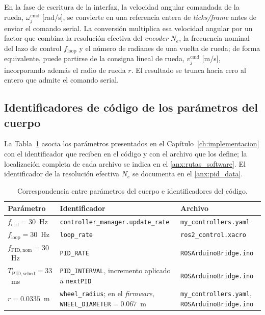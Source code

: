 \begin{appendices}
En la fase de escritura de la interfaz, la velocidad angular comandada de la rueda, $\omega_j^{\mathrm{cmd}}$ [rad/s], se convierte en una referencia entera de \textit{ticks/frame} antes de enviar el comando serial. La conversión multiplica esa velocidad angular por un factor que combina la resolución efectiva del \textit{encoder} $N_e$, la frecuencia nominal del lazo de control $f_{\mathrm{loop}}$ y el número de radianes de una vuelta de rueda; de forma equivalente, puede partirse de la consigna lineal de rueda, $v_j^{\mathrm{cmd}}$ [m/s], incorporando además el radio de rueda $r$. El resultado se trunca hacia cero al entero que admite el comando serial.

\subsection{Identificadores de código de los parámetros del cuerpo}
\label{anx:identificadores}

La Tabla~\ref{tab:anx_identificadores} asocia los parámetros presentados en el
Capítulo~\ref{ch:implementacion} con el identificador que reciben en el
código y con el archivo que los define; la localización completa de cada
archivo se indica en el \ref{anx:rutas_software}. El identificador de la
resolución efectiva $N_e$ se documenta en el \ref{anx:pid_data}.

\begin{table}[H]
\centering
\caption{Correspondencia entre parámetros del cuerpo e identificadores del código.}
\label{tab:anx_identificadores}
\small
\begin{tabular}{p{3.5cm} p{6.3cm} p{4.1cm}}
\toprule
\textbf{Parámetro} & \textbf{Identificador} & \textbf{Archivo} \\
\midrule
$f_{\mathrm{ctrl}}=30$~Hz &
\texttt{controller\_manager.update\_rate} &
\texttt{my\_controllers.yaml} \\

$f_{\mathrm{loop}}=30$~Hz &
\texttt{loop\_rate} &
\texttt{ros2\_control.xacro} \\

$f_{\mathrm{PID,nom}}=30$~Hz &
\texttt{PID\_RATE} &
\texttt{ROSArduinoBridge.ino} \\

$T_{\mathrm{PID,sched}}=33$~ms &
\texttt{PID\_INTERVAL}, incremento aplicado a \texttt{nextPID} &
\texttt{ROSArduinoBridge.ino} \\

$r=0.0335$~m &
\texttt{wheel\_radius}; en el \textit{firmware}, \texttt{WHEEL\_DIAMETER}$=0.067$~m &
\texttt{my\_controllers.yaml}, \texttt{ROSArduinoBridge.ino} \\


\end{tabular}
\end{table}
\end{appendices}
